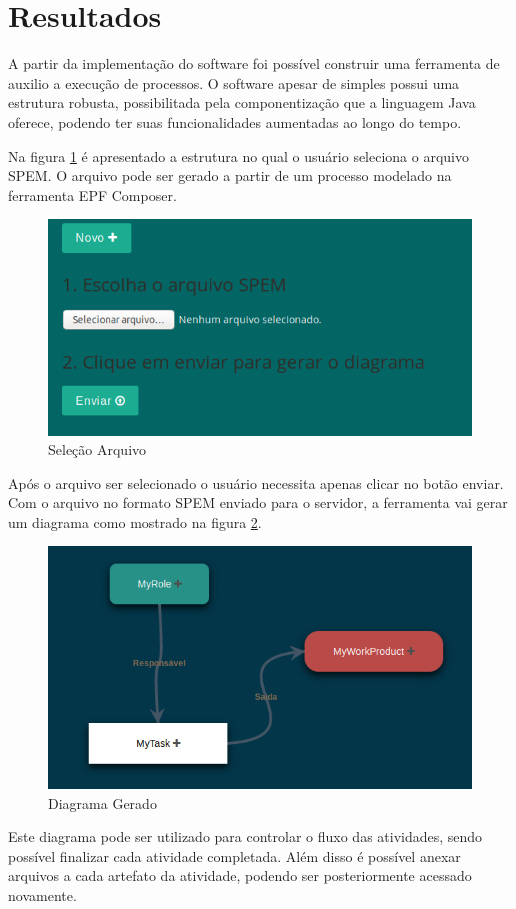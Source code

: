 \section{Resultados}\label{resultados}
A partir da implementação do software foi possível construir uma ferramenta de auxilio a execução de processos. O software apesar de simples possui uma estrutura robusta, possibilitada pela componentização que a linguagem Java oferece, podendo ter suas funcionalidades aumentadas ao longo do tempo.

Na figura \ref{figura:selecaoarquivo} é apresentado a estrutura no qual o usuário seleciona o arquivo SPEM. O arquivo pode ser gerado a partir de um processo modelado na ferramenta EPF Composer.
\begin{figure}[!htb]
	\caption{Seleção Arquivo}
	\label{figura:selecaoarquivo}
	\centering
	\includegraphics[width=1\textwidth]{img/ferramenta_selecao_arquivo.png}
\end{figure}

Após o arquivo ser selecionado o usuário necessita apenas clicar no botão enviar. Com o arquivo no formato SPEM enviado para o servidor, a ferramenta vai gerar um diagrama como mostrado na figura \ref{figura:diagramagerado}.

\begin{figure}[!htb]
	\caption{Diagrama Gerado}
	\label{figura:diagramagerado}
	\centering
	\includegraphics[width=1\textwidth]{img/ferramenta_diagrama_gerado.png}
\end{figure}

Este diagrama pode ser utilizado para controlar o fluxo das atividades, sendo possível finalizar cada atividade completada. Além disso é possível anexar arquivos a cada artefato da atividade, podendo ser posteriormente acessado novamente.